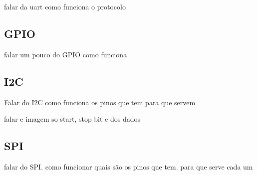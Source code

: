 falar da uart como funciona o protocolo

\subsection{GPIO}

falar um pouco do GPIO como funciona

\subsection{I2C}

Falar do I2C como funciona os pinos que tem para que servem

falar e imagem so start, stop bit e dos dados

\subsection{SPI}

falar do SPI. como funcionar quais s\~ao os pinos que tem. para que serve cada um
